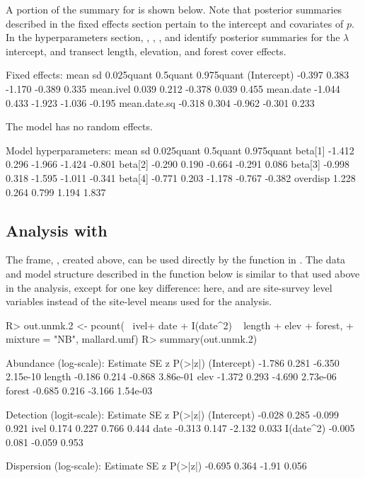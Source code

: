 \documentclass[codesnippet]{jss}
\begin{document}
A portion of the summary for  is shown below. Note that posterior summaries described in the fixed effects section pertain to the intercept and covariates of $p$. In the hyperparameters section, , , , and  identify posterior summaries for the $\lambda$ intercept, and transect length, elevation, and forest cover effects.

\begin{CodeOutput}
Fixed effects:
               mean    sd 0.025quant  0.5quant  0.975quant
(Intercept)  -0.397 0.383     -1.170    -0.389       0.335
mean.ivel     0.039 0.212     -0.378     0.039       0.455
mean.date    -1.044 0.433     -1.923    -1.036      -0.195
mean.date.sq -0.318 0.304     -0.962    -0.301       0.233

The model has no random effects.

Model hyperparameters:
             mean     sd  0.025quant  0.5quant  0.975quant
beta[1]    -1.412  0.296      -1.966    -1.424      -0.801 
beta[2]    -0.290  0.190      -0.664    -0.291       0.086
beta[3]    -0.998  0.318      -1.595    -1.011      -0.341
beta[4]    -0.771  0.203      -1.178    -0.767      -0.382
overdisp    1.228  0.264       0.799     1.194       1.837
\end{CodeOutput}

\subsection[Analysis with unmarked]{Analysis with }
The  frame, , created above, can be used directly by the  function in . The data and model structure described in the  function below is similar to that used above in the  analysis, except for one key difference: here,  and  are site-survey level variables instead of the site-level means used for the  analysis.

\begin{CodeInput}
R> out.unmk.2 <- pcount(~ ivel+ date + I(date^2) ~ length + elev + forest,
+    mixture = "NB", mallard.umf)
R> summary(out.unmk.2)
\end{CodeInput}
\begin{CodeOutput}
Abundance (log-scale):
             Estimate         SE           z     P(>|z|)
(Intercept)    -1.786      0.281      -6.350    2.15e-10
length         -0.186      0.214      -0.868    3.86e-01
elev           -1.372      0.293      -4.690    2.73e-06
forest         -0.685      0.216      -3.166    1.54e-03

Detection (logit-scale):
             Estimate         SE           z     P(>|z|)
(Intercept)    -0.028      0.285      -0.099       0.921
ivel            0.174      0.227       0.766       0.444
date           -0.313      0.147      -2.132       0.033
I(date^2)      -0.005      0.081      -0.059       0.953

Dispersion (log-scale):
Estimate          SE       z    P(>|z|)
-0.695         0.364   -1.91      0.056
\end{CodeOutput}
\end{document}
